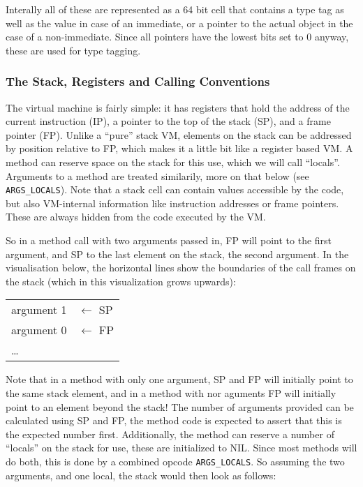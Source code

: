 \documentclass[12pt,a4paper]{article}
\begin{document}

Interally all of these are represented as a 64 bit cell that contains a type tag as well as the value in case of an immediate, or a pointer to the actual object in the case of a non-immediate. Since all pointers have the lowest bits set to 0 anyway, these are used for type tagging.

\subsubsection{The Stack, Registers and Calling Conventions}\label{sec:stack}

The virtual machine is fairly simple: it has registers that hold the address of the current instruction (IP), a pointer to the top of the stack (SP), and a frame pointer (FP). Unlike a ``pure'' stack VM, elements on the stack can be addressed by position relative to FP, which makes it a little bit like a
register based VM. A method can reserve space on the stack for this use, which we will call ``locals''. Arguments to a method are treated similarily, more on that below (see \verb|ARGS_LOCALS|). Note that a stack cell can contain values accessible by the code, but also VM-internal information like instruction addresses or frame pointers. These are always hidden from the code executed by the VM.

So in a method call with two arguments passed in, FP will point to the first argument, and SP to the last element on the stack, the second argument. In the visualisation below, the horizontal lines show the boundaries of the call frames on the stack (which in this visualization grows upwards):

\begin{table}[H]
\centering
\begin{tabular}{|p{3cm}|p{3cm}}
argument 1 & $\leftarrow$ SP \\
argument 0 & $\leftarrow$ FP \\
\cline{1-1}
\ldots & \\
\end{tabular}
\end{table}

Note that in a method with only one argument, SP and FP will initially point to the same stack element, and in a method with nor aguments FP will initially point to an element beyond the stack! The number of arguments provided can be calculated using SP and FP, the method code is expected to assert that this is the expected number first. Additionally, the method can reserve a number of ``locals'' on the stack for use, these are initialized to NIL. Since most methods will do both, this is done by a combined opcode \verb|ARGS_LOCALS|. So assuming the two arguments, and one local, the stack would then look as follows:
\end{document}
